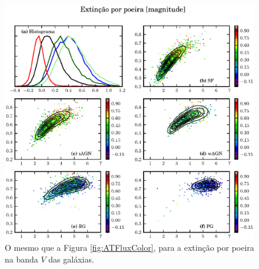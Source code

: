 \begin{figure}
	\includegraphics{figuras/uvcolor-color-AV-byclass.eps}
	\caption[Extinção por poeira no diagrama cor--cor.]
	{O mesmo que a Figura \ref{fig:ATFluxColor}, para a extinção por
	poeira na banda $V$ das galáxias.}
	\label{fig:AVColor}
\end{figure}


